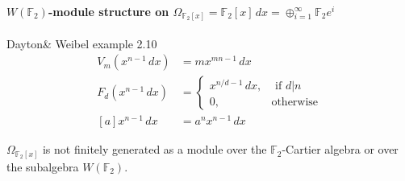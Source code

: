\paragraph{$W(\mathbb{F}_2)$-module structure on $\Omega_{\mathbb{F}_2[x]}=\mathbb{F}_2[x]\,dx = \oplus_{i=1}^\infty \mathbb{F}_2 e^i$} Dayton\& Weibel example 2.10
\begin{align*}
 V_m(x^{n-1}\,dx)&=mx^{mn-1}\,dx\\
 F_d(x^{n-1}\,dx)&=\begin{cases}
 	x^{n/d-1}\,dx,& \mbox{ if $d|n$}\\
 	0,& \mbox{otherwise}
 \end{cases}\\
 [a]x^{n-1}\,dx&=a^nx^{n-1}\,dx
 \end{align*}
 \begin{remark}
 	$\Omega_{\mathbb{F}_2[x]}$ is {\color{red}not} finitely generated as a module over the $\mathbb{F}_2$-Cartier algebra or over the subalgebra $W(\mathbb{F}_2)$.
 \end{remark}